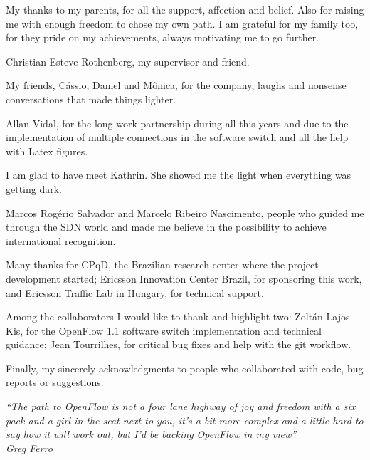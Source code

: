 \begin{agradecimentos}
   
    My thanks to my parents, for all the support, affection and belief. Also for raising me with enough freedom to chose my own path. I am grateful for my family too, for they pride on my achievements, always motivating me to go further. 

    Christian Esteve Rothenberg, my supervisor and friend. 

    My friends, C\'{a}ssio, Daniel and M\^{o}nica, for the company, laughs and nonsense conversations that made things lighter. 
    
    Allan Vidal, for the long work partnership during all this years and due to the implementation of multiple connections in the software switch and all the help with Latex figures.

    I am glad to have meet Kathrin. She showed me the light when everything was getting dark.

    Marcos Rog\'{e}rio Salvador and Marcelo Ribeiro Nascimento, people who guided me through the SDN world and made me believe in the possibility to achieve international recognition.
    
    Many thanks for CPqD, the Brazilian research center where the project development started; Ericsson Innovation Center Brazil, for sponsoring this work, and Ericsson Traffic Lab in Hungary, for technical support. 

    Among the collaborators I would like to thank and highlight two: Zoltán Lajos Kis, for the OpenFlow 1.1 software switch implementation and technical guidance; Jean Tourrilhes, for critical bug fixes and help with the git workflow.

    Finally, my sincerely acknowledgments to people who collaborated with code, bug reports or suggestions.
    
    
\end{agradecimentos}

\begin{epigrafe}
    \vspace*{\fill}
	\begin{flushright}
		\textit{``The path to OpenFlow is not a four lane highway of joy and freedom with a six pack and a girl in the seat next to you, it’s a bit more complex and a little hard to say how it will work out, but I’d be backing OpenFlow in my view''\\
		Greg Ferro}
	\end{flushright}
\end{epigrafe}


